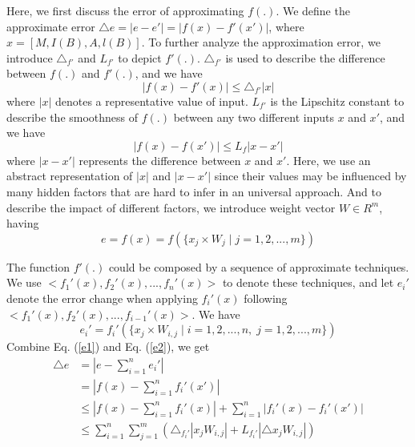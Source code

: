 \documentclass[10pt, conference, letterpaper]{IEEEtran}
\begin{document}
Here, we first discuss the error of approximating $f(.)$. We define the approximate error $\triangle e=|e-e'|=|f(x)-f'(x')|$, where $x=[M,I(B),A,l(B)]$. To further analyze the approximation error, we introduce $\triangle_{f'}$ and $L_{f'}$ to depict $f'(.)$. $\triangle_{f'}$ is used to describe the difference between $f(.)$ and $f'(.)$, and we have
\begin{equation} \label{e1}
|f(x)-f'(x)| \leq \triangle_{f'}|x|
\end{equation}
where $|x|$ denotes a representative value of input. $L_{f'}$ is the Lipschitz constant to describe the smoothness of $f(.)$ between any two different inputs $x$ and $x'$, and we have
\begin{equation} \label{e2}
|f(x)-f(x')| \leq L_{f}|x-x'|
\end{equation}
where $|x-x'|$ represents the difference between $x$ and $x'$. Here, we use an abstract representation of $|x|$ and $|x-x'|$ since their values may be influenced by many hidden factors that are hard to infer in an universal approach. And to describe the impact of different factors, we introduce weight vector $W \in R^m$, having
\begin{equation} \label{e3}
e=f(x)=f(\{x_j \times W_j \; | \; j=1,2,...,m\})
\end{equation}

The function $f'(.)$ could be composed by a sequence of approximate techniques. We use $<f_1'(x),f_2'(x),...,f_n'(x)>$ to denote these techniques, and let $e_i'$ denote the error change when applying $f_i'(x)$ following $<f_1'(x),f_2'(x),...,f_{i-1}'(x)>$. We have
\begin{equation} \label{e4}
e_i'=f_i'(\{x_j \times W_{i,j} \; | \; i=1,2,...,n, \; j=1,2,...,m\})
\end{equation}
Combine Eq. (\ref{e1}) and Eq. (\ref{e2}), we get
\renewcommand{\arraystretch}{1.5}
\begin{equation} \label{e5}
\begin{array}{ll}
\triangle e & =|e-\sum_{i=1}^{n} e_i'| \\
& =|f(x)-\sum_{i=1}^{n} f_i'(x')| \\
& \leq |f(x)-\sum_{i=1}^{n} f_i'(x)| + \sum_{i=1}^{n} |f_i'(x)-f_i'(x')| \\
& \leq \sum_{i=1}^{n}\sum_{j=1}^{m} (\triangle_{f_i'}|x_jW_{i,j}| + L_{f_i'}|\triangle x_jW_{i,j}|)
\end{array}
\end{equation}
\renewcommand{\arraystretch}{0.667}
\end{document}
